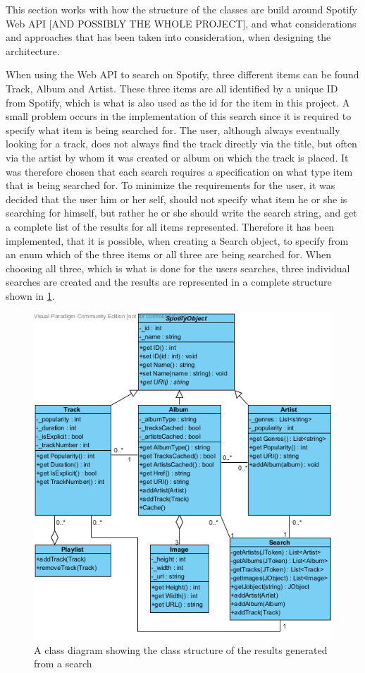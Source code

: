 This section works with how the structure of the classes are build around Spotify Web API [AND POSSIBLY THE WHOLE PROJECT], and what considerations and approaches that has been taken into consideration, when designing the architecture. 


When using the Web API to search on Spotify, three different items can be found Track, Album and Artist. These three items are all identified by a unique ID from Spotify, which is what is also used as the id for the item in this project. A small problem occurs in the implementation of this search since it is required to specify what item is being searched for. The user, although always eventually looking for a track, does not always find the track directly via the title, but often via the artist by whom it was created or album on which the track is placed. It was therefore chosen that each search requires a specification on what type item that is being searched for. To minimize the requirements for the user, it was decided that the user him or her self, should not specify what item he or she is searching for himself, but rather he or she should write the search string, and get a complete list of the results for all items represented. Therefore it has been implemented, that it is possible, when creating a Search object, to specify from an enum which of the three items or all three are being searched for. When choosing all three, which is what is done for the users searches, three individual searches are created and the results are represented in a complete structure shown in \cref{fig:WebAPIUML}.

\begin{figure}[H] 
\centering 
\includegraphics[width=\textwidth]{Images/WebAPIUML.png} 
\caption{A class diagram showing the class structure of the results generated from a search} 
\label{fig:WebAPIUML} 
\end{figure} 


